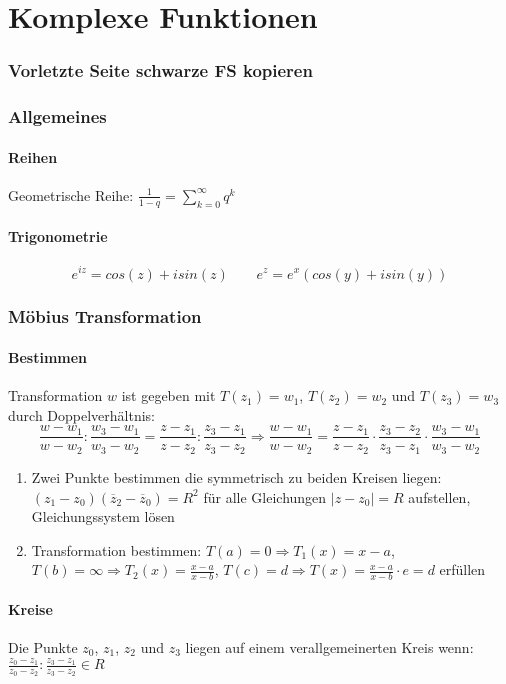 \documentclass[10pt,a4paper]{article}
\begin{document}
\part*{Komplexe Funktionen}

\section{Vorletzte Seite schwarze FS kopieren}

\section{Allgemeines}
\subsection{Reihen}
Geometrische Reihe: $\frac{1}{1-q} = \sum\limits_{k=0}^\infty q^k$

\subsection{Trigonometrie}
\[e^{iz} = cos(z)+i sin(z)\ \ \ \ \ \ \ \ \ e^z = e^x(cos(y)+i sin(y))\]

\section{Möbius Transformation}
\subsection{Bestimmen}
Transformation $w$ ist gegeben mit $T(z_1)=w_1$, $T(z_2)=w_2$ und $T(z_3)=w_3$ durch Doppelverhältnis:
\[
\frac{w-w_1}{w-w_2} : \frac{w_3-w_1}{w_3-w_2} = \frac{z-z_1}{z-z_2} : \frac{z_3-z_1}{z_3-z_2}
\Rightarrow
\frac{w-w_1}{w-w_2} = \frac{z-z_1}{z-z_2} \cdot \frac{z_3-z_2}{z_3-z_1}  \cdot \frac{w_3-w_1}{w_3-w_2}
\]
\begin{enumerate}
\item Zwei Punkte bestimmen die symmetrisch zu beiden Kreisen liegen: $(z_1 - z_0)(\overline{z}_2 - \overline{z}_0) = R^2$ für alle Gleichungen $|z - z_0| = R$ aufstellen, Gleichungssystem lösen
\item Transformation bestimmen: $T(a) = 0 \Rightarrow T_1(x) = x - a$, $T(b) = \infty \Rightarrow T_2(x) = \frac{x-a}{x-b}$, $T(c) = d \Rightarrow T(x) = \frac{x-a}{x-b} \cdot e = d$ erfüllen
\end{enumerate}
\subsection{Kreise}
Die Punkte $z_0$, $z_1$, $z_2$ und $z_3$ liegen auf einem verallgemeinerten Kreis wenn:
$\frac{z_0-z_1}{z_0-z_2} : \frac{z_3-z_1}{z_3-z_2} \in R$
\end{document}
